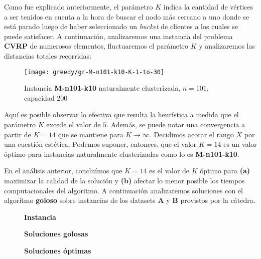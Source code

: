 Como fue explicado anteriormente, el parámetro $K$ indica la cantidad de vértices a ser tenidos en cuenta a la hora de buscar el nodo más cercano a uno donde se está parado luego de haber seleccionado un \textit{bucket} de clientes a los cuales se puede satisfacer. A continuación, analizaremos una instancia del problema \textbf{CVRP} de numerosos elementos, fluctuaremos el parámetro $K$ y analizaremos las distancias totales recorridas:

\begin{figure}[H]
	\centering
	\texttt{[image: greedy/gr-M-n101-k10-K-1-to-30]}
	\caption{\footnotesize Instancia \textbf{M-n101-k10} naturalmente clusterizada, $n=101$, capacidad 200}
	\label{fig:gr-M-n101-k10-K-1-to-30}
\end{figure}

Aquí es posible observar lo efectiva que resulta la heurística a medida que el parámetro $K$ excede el valor de $5$. Además, se puede notar una convergencia a partir de $K=14$ que se mantiene para $K \rightarrow \infty$. Decidimos acotar el rango $X$ por una cuestión estética. Podemos suponer, entonces, que el valor $K=14$ es un valor óptimo para instancias naturalmente clusterizadas como lo es \textbf{M-n101-k10}.

En el análisis anterior, concluímos que $K=14$ es el valor de $K$ óptimo para \textbf{(a)} maximizar la calidad de la solución y \textbf{(b)} afectar lo menor posible los tiempos computacionales del algoritmo. A continuación analizaremos soluciones con el algoritmo \textbf{goloso} sobre instancias de los datasets \textbf{A} y \textbf{B} provistos por la cátedra.

\begin{figure}[H]
	\begin{minipage}{0.15\textwidth}
		\centering
		\textbf{Instancia}
	\end{minipage}%
	\begin{minipage}{0.40\textwidth}
		\centering
		\textbf{Soluciones golosas}
	\end{minipage}%
	\hspace{0.03\textwidth}
	\begin{minipage}{0.40\textwidth}
		\centering
		\textbf{Soluciones óptimas}
	\end{minipage}%
\end{figure}

